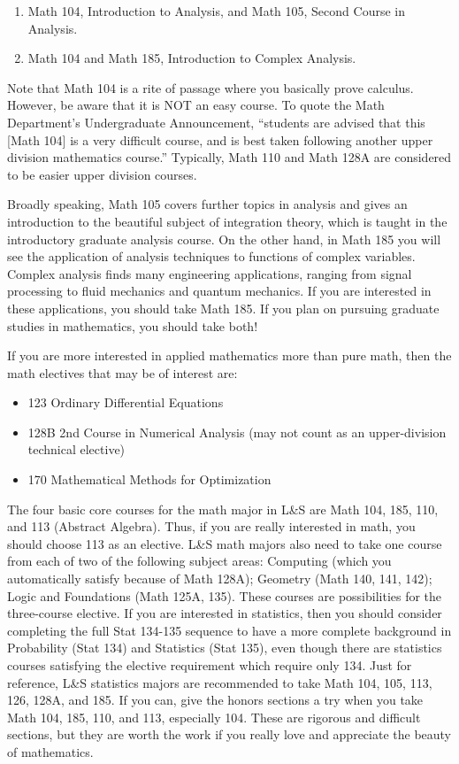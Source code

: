 \begin{enumerate}
  \item Math 104, Introduction to Analysis, and Math 105, Second Course in Analysis.
  \item Math 104 and Math 185, Introduction to Complex Analysis.
\end{enumerate}

Note that Math 104 is a rite of passage where you basically prove calculus.
However, be aware that it is NOT an easy course.
To quote the Math Department’s Undergraduate Announcement, “students are advised that this [Math 104] is a very difficult course, and is best taken following another upper division mathematics course.”
Typically, Math 110 and Math 128A are considered to be easier upper division courses.

Broadly speaking, Math 105 covers further topics in analysis and gives an introduction to the beautiful subject of integration theory, which is taught in the introductory graduate analysis course.
On the other hand, in Math 185 you will see the application of analysis techniques to functions of complex variables.
Complex analysis finds many engineering applications, ranging from signal processing to fluid mechanics and quantum mechanics.
If you are interested in these applications, you should take Math 185.
If you plan on pursuing graduate studies in mathematics, you should take both!

If you are more interested in applied mathematics more than pure math, then the math electives that may be of interest are:

\begin{itemize}
  \item 123 Ordinary Differential Equations
  \item 128B 2nd Course in Numerical Analysis (may not count as an upper-division technical elective)
  \item 170 Mathematical Methods for Optimization
\end{itemize}

The four basic core courses for the math major in L\&S are Math 104, 185, 110, and 113 (Abstract Algebra).
Thus, if you are really interested in math, you should choose 113 as an elective. L\&S math majors also need to take one course from each of two of the following subject areas: Computing (which you automatically satisfy because of Math 128A); Geometry (Math 140, 141, 142); Logic and Foundations (Math 125A, 135). These courses are possibilities for the three-course elective. If you are interested in statistics, then you should consider completing the full Stat 134-135 sequence to have a more complete background in Probability (Stat 134) and Statistics (Stat 135), even though there are statistics courses satisfying the elective requirement which require only 134. Just for reference, L\&S statistics majors are recommended to take Math 104, 105, 113, 126, 128A, and 185. If you can, give the honors sections a try when you take Math 104, 185, 110, and 113, especially 104. These are rigorous and difficult sections, but they are worth the work if you really love and appreciate the beauty of mathematics.

